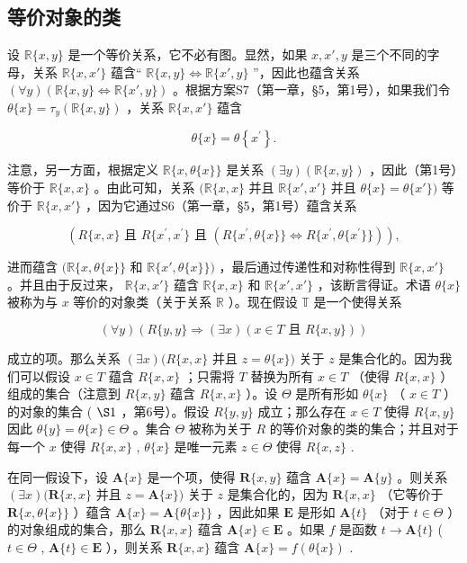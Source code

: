 \subsection{等价对象的类}

设 \(\mathbb{R}\{x, y\}\) 是一个等价关系，它不必有图。显然，如果 \(x, x', y\) 是三个不同的字母，关系 \(\mathbb{R}\{x, x'\}\) 蕴含“ \(\mathbb{R}\{x, y\} \Longleftrightarrow \mathbb{R}\{x', y\}\) ”，因此也蕴含关系 \((\forall y)(\mathbb{R}\{x, y\} \Longleftrightarrow \mathbb{R}\{x', y\})\) 。根据方案S7（第一章，§5，第1号），如果我们令 \(\theta\{x\} = \tau_y(\mathbb{R}\{x, y\})\) ，关系 \(\mathbb{R}\{x, x'\}\) 蕴含

\[
\theta \{x \} = \theta \left\{x ^ {\prime} \right\}.
\]

注意，另一方面，根据定义 \(\mathbb{R}\{x, \theta\{x\}\}\) 是关系 \((\exists y)(\mathbb{R}\{x, y\})\) ，因此（第1号）等价于 \(\mathbb{R}\{x, x\}\) 。由此可知，关系 \((\mathbb{R}\{x, x\}\) 并且 \(\mathbb{R}\{x', x'\}\) 并且 \(\theta\{x\} = \theta\{x'\})\) 等价于 \(\mathbb{R}\{x, x'\}\) ，因为它通过S6（第一章，§5，第1号）蕴含关系

\[
(R \{x, x \} \text {   且   } R \{x ^ {\prime}, x ^ {\prime} \} \text {   且   } (R \{x ^ {\prime}, \theta \{x \} \} \iff R \{x ^ {\prime}, \theta \{x ^ {\prime} \} \})),
\]

进而蕴含 \((\mathbb{R}\{x, \theta\{x\}\}\) 和 \(\mathbb{R}\{x', \theta\{x\}\})\) ，最后通过传递性和对称性得到 \(\mathbb{R}\{x, x'\}\) 。并且由于反过来， \(\mathbb{R}\{x, x'\}\) 蕴含 \(\mathbb{R}\{x, x\}\) 和 \(\mathbb{R}\{x', x'\}\) ，该断言得证。术语 \(\theta\{x\}\) 被称为与 \(x\) 等价的对象类（关于关系 \(\mathbb{R}\) ）。现在假设 \(\mathbb{T}\) 是一个使得关系

\[
(\forall y) (R \{y, y \} \Longrightarrow (\exists x) (x \in T \text {   且   } R \{x, y \}))\tag{1}
\]

成立的项。那么关系 \((\exists x)(R\{x, x\}\) 并且 \(z = \theta\{x\})\) 关于 \(z\) 是集合化的。因为我们可以假设 \(x \in T\) 蕴含 \(R\{x, x\}\) ；只需将 \(T\) 替换为所有 \(x \in T\) （使得 \(R\{x, x\}\) ）组成的集合（注意到 \(R\{x, y\}\) 蕴含 \(R\{x, x\}\) ）。设 \(\Theta\) 是所有形如 \(\theta\{x\}\) （ \(x \in T\) ）的对象的集合 ( \(\S 1\) ，第6号）。假设 \(R\{y, y\}\) 成立；那么存在 \(x \in T\) 使得 \(R\{x, y\}\) 因此 \(\theta\{y\} = \theta\{x\} \in \Theta\) 。集合 \(\Theta\) 被称为关于 \(R\) 的等价对象的类的集合；并且对于每一个 \(x\) 使得 \(R\{x, x\}\) , \(\theta\{x\}\) 是唯一元素 \(z \in \Theta\) 使得 \(R\{x, z\}\) .

在同一假设下，设 \(\mathbf{A}\{x\}\) 是一个项，使得 \(\mathbf{R}\{x,y\}\) 蕴含 \(\mathbf{A}\{x\} = \mathbf{A}\{y\}\) 。则关系 \((\exists x)(\mathbf{R}\{x,x\}\) 并且 \(z = \mathbf{A}\{x\})\) 关于 \(z\) 是集合化的，因为 \(\mathbf{R}\{x,x\}\) （它等价于 \(\mathbf{R}\{x,\theta\{x\}\}\) ）蕴含 \(\mathbf{A}\{x\} = \mathbf{A}\{\theta\{x\}\}\) ，因此如果 \(\mathbf{E}\) 是形如 \(\mathbf{A}\{t\}\) （对于 \(t \in \Theta\) ）的对象组成的集合，那么 \(\mathbf{R}\{x,x\}\) 蕴含 \(\mathbf{A}\{x\} \in \mathbf{E}\) 。如果 \(f\) 是函数 \(t \to \mathbf{A}\{t\}\) ( \(t \in \Theta\) , \(\mathbf{A}\{t\} \in \mathbf{E}\) ），则关系 \(\mathbf{R}\{x,x\}\) 蕴含 \(\mathbf{A}\{x\} = f(\theta\{x\})\) .

